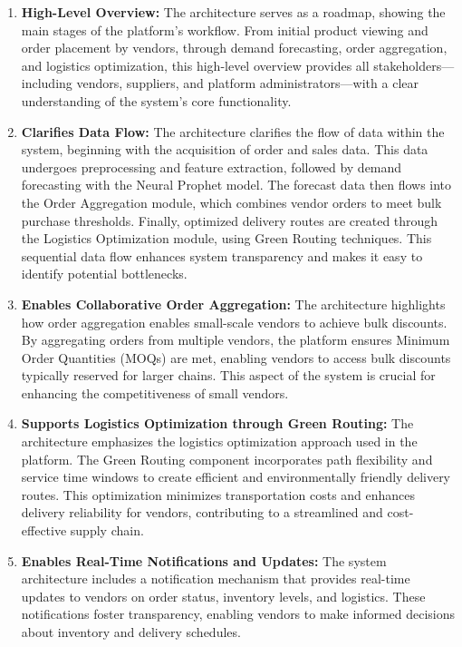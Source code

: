\begin{enumerate}
    \item \textbf{High-Level Overview:} The architecture serves as a roadmap, showing the main stages of the platform’s workflow. From initial product viewing and order placement by vendors, through demand forecasting, order aggregation, and logistics optimization, this high-level overview provides all stakeholders—including vendors, suppliers, and platform administrators—with a clear understanding of the system’s core functionality.

    \item \textbf{Clarifies Data Flow:} The architecture clarifies the flow of data within the system, beginning with the acquisition of order and sales data. This data undergoes preprocessing and feature extraction, followed by demand forecasting with the Neural Prophet model. The forecast data then flows into the Order Aggregation module, which combines vendor orders to meet bulk purchase thresholds. Finally, optimized delivery routes are created through the Logistics Optimization module, using Green Routing techniques. This sequential data flow enhances system transparency and makes it easy to identify potential bottlenecks.

    \item \textbf{Enables Collaborative Order Aggregation:} The architecture highlights how order aggregation enables small-scale vendors to achieve bulk discounts. By aggregating orders from multiple vendors, the platform ensures Minimum Order Quantities (MOQs) are met, enabling vendors to access bulk discounts typically reserved for larger chains. This aspect of the system is crucial for enhancing the competitiveness of small vendors.

    \item \textbf{Supports Logistics Optimization through Green Routing:} The architecture emphasizes the logistics optimization approach used in the platform. The Green Routing component incorporates path flexibility and service time windows to create efficient and environmentally friendly delivery routes. This optimization minimizes transportation costs and enhances delivery reliability for vendors, contributing to a streamlined and cost-effective supply chain.

    \item \textbf{Enables Real-Time Notifications and Updates:} The system architecture includes a notification mechanism that provides real-time updates to vendors on order status, inventory levels, and logistics. These notifications foster transparency, enabling vendors to make informed decisions about inventory and delivery schedules.


\end{enumerate}
